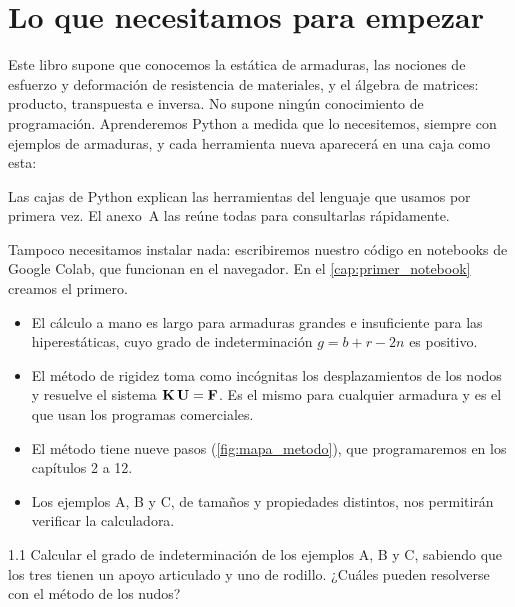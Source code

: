 \section{Lo que necesitamos para empezar}\label{sec:requisitos}

Este libro supone que conocemos la estática de armaduras, las nociones de
esfuerzo y deformación de resistencia de materiales, y el álgebra de
matrices: producto, transpuesta e inversa. No supone ningún conocimiento de
programación. Aprenderemos Python a medida que lo necesitemos, siempre con
ejemplos de armaduras, y cada herramienta nueva aparecerá en una caja como
esta:

\begin{python}
Las cajas de Python explican las herramientas del lenguaje que usamos por
primera vez. El anexo~A las reúne todas para consultarlas rápidamente.
\end{python}

Tampoco necesitamos instalar nada: escribiremos nuestro código en notebooks de
Google Colab, que funcionan en el navegador. En el \cref{cap:primer_notebook}
creamos el primero.

\repasoyresumen

\begin{itemize}
  \item El cálculo a mano es largo para armaduras grandes e insuficiente para
    las hiperestáticas, cuyo grado de indeterminación $g = b + r - 2n$ es
    positivo.
  \item El método de rigidez toma como incógnitas los desplazamientos de los
    nodos y resuelve el sistema $\mathbf{K}\,\mathbf{U} = \mathbf{F}$. Es el mismo para cualquier
    armadura y es el que usan los programas comerciales.
  \item El método tiene nueve pasos (\cref{fig:mapa_metodo}), que
    programaremos en los capítulos 2 a 12.
  \item Los ejemplos A, B y C, de tamaños y propiedades distintos, nos
    permitirán verificar la calculadora.
\end{itemize}

\ejercicios

\begin{ejercicio}{1.1}
Calcular el grado de indeterminación de los ejemplos A, B y C, sabiendo que
los tres tienen un apoyo articulado y uno de rodillo. ¿Cuáles pueden
resolverse con el método de los nudos?
\end{ejercicio}

